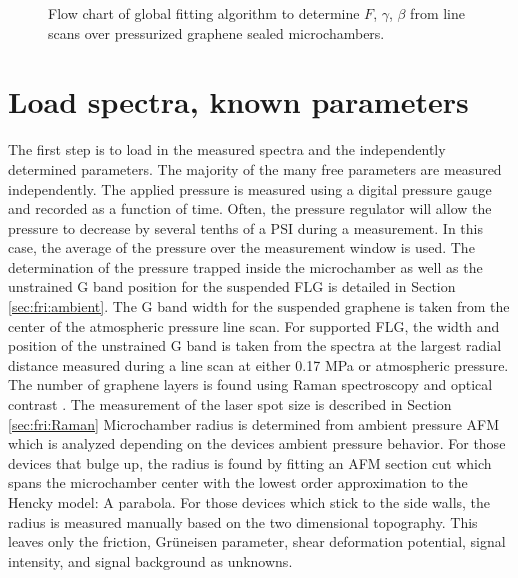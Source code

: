 \begin{figure}
	\begin{center}
	
	\end{center}
	\caption[Global fitting algorithm flow chart]{\label{fig:Fit:Flow}
	Flow chart of global fitting algorithm to determine $F$, $\gamma$, $\beta$ from line scans over pressurized graphene sealed microchambers.}
\end{figure}

\section*{Load spectra, known parameters}
The first step is to load in the measured spectra and the independently determined parameters.
The majority of the many free parameters are measured independently.
The applied pressure is measured using a digital pressure gauge and recorded as a function of time.
Often, the pressure regulator will allow the pressure to decrease by several tenths of a PSI during a measurement.
In this case, the average of the pressure over the measurement window is used.
The determination of the pressure trapped inside the microchamber as well as the unstrained G band position for the suspended FLG is detailed in Section \ref{sec:fri:ambient}.
The G band width for the suspended graphene is taken from the center of the atmospheric pressure line scan.
For supported FLG, the width and position of the unstrained G band is taken from the spectra at the largest radial distance measured during a line scan at either 0.17 MPa or atmospheric pressure.
The number of graphene layers is found using Raman spectroscopy \cite{Ferrari2006} and optical contrast \cite{Blake2007,Casiraghi2007a}.
The measurement of the laser spot size is described in Section \ref{sec:fri:Raman}
Microchamber radius is determined from ambient pressure AFM which is analyzed depending on the devices ambient pressure behavior.
For those devices that bulge up, the radius is found by fitting an AFM section cut which spans the microchamber center with the lowest order approximation to the Hencky model: A parabola.
For those devices which stick to the side walls, the radius is measured manually based on the two dimensional topography.
This leaves only the friction, Gr\"{u}neisen parameter, shear deformation potential, signal intensity, and signal background as unknowns.

